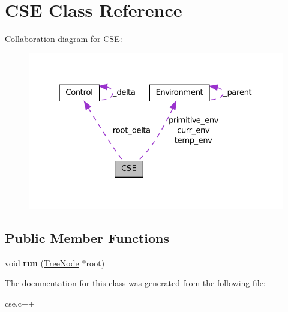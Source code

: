 \hypertarget{classCSE}{
\section{CSE Class Reference}
\label{classCSE}
}


Collaboration diagram for CSE:\nopagebreak
\begin{figure}[H]
\begin{center}
\leavevmode
\includegraphics[width=327pt]{classCSE__coll__graph}
\end{center}
\end{figure}
\subsection*{Public Member Functions}
\begin{DoxyCompactItemize}
\item 
\hypertarget{classCSE_a9c228b4b996b105db362bf06b909b242}{
void {\bfseries run} (\hyperlink{classTreeNode}{TreeNode} $\ast$root)}
\label{classCSE_a9c228b4b996b105db362bf06b909b242}

\end{DoxyCompactItemize}


The documentation for this class was generated from the following file:\begin{DoxyCompactItemize}
\item 
cse.c++\end{DoxyCompactItemize}
